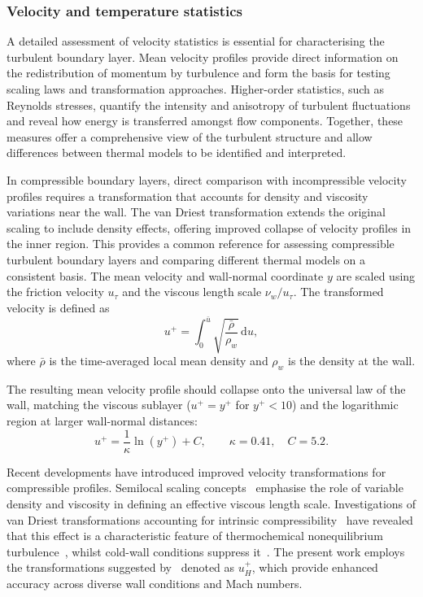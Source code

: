 \subsubsection{Velocity and temperature statistics}
A detailed assessment of velocity statistics is essential for characterising the turbulent boundary layer. Mean velocity profiles provide direct information on the redistribution of momentum by turbulence and form the basis for testing scaling laws and transformation approaches. Higher-order statistics, such as Reynolds stresses, quantify the intensity and anisotropy of turbulent fluctuations and reveal how energy is transferred amongst flow components. Together, these measures offer a comprehensive view of the turbulent structure and allow differences between thermal models to be identified and interpreted.

In compressible boundary layers, direct comparison with incompressible velocity profiles requires a transformation that accounts for density and viscosity variations near the wall. The van Driest transformation \citep{VanDriest1952} extends the original scaling to include density effects, offering improved collapse of velocity profiles in the inner region. This provides a common reference for assessing compressible turbulent boundary layers and comparing different thermal models on a consistent basis. The mean velocity and wall-normal coordinate $y$ are scaled using the friction velocity $u_{\tau}$ and the viscous length scale $\nu_w/u_{\tau}$. The transformed velocity is defined as
\begin{equation}
    u^{+} = \int_{0}^{\bar{u}} \sqrt{\frac{\bar{\rho}}{\rho_w}} \, \mathrm{d}u ,
\end{equation}
where $\bar{\rho}$ is the time-averaged local mean density and $\rho_w$ is the density at the wall.

The resulting mean velocity profile should collapse onto the universal law of the wall, matching the viscous sublayer ($u^{+}=y^{+}$ for $y^{+}<10$) and the logarithmic region at larger wall-normal distances:
\begin{equation}
u^{+} = \frac{1}{\kappa}\ln(y^{+}) + C, 
\qquad \kappa = 0.41, \quad C = 5.2.
\end{equation}

Recent developments have introduced improved velocity transformations for compressible profiles. Semilocal scaling concepts~\citep{TrettelLarsson2016,GriffinEtAl2021,KumarLarsson2022} emphasise the role of variable density and viscosity in defining an effective viscous length scale. Investigations of van Driest transformations accounting for intrinsic compressibility~\citep{HasanEtal2023,HasanEtal2024} have revealed that this effect is a characteristic feature of thermochemical nonequilibrium turbulence~\citep{Williamsetal2025}, whilst cold-wall conditions suppress it~\citep{Zhangetal2018}. The present work employs the transformations suggested by~\citep{HasanEtal2024} denoted as $u^{+}_{H}$, which provide enhanced accuracy across diverse wall conditions and Mach numbers.

